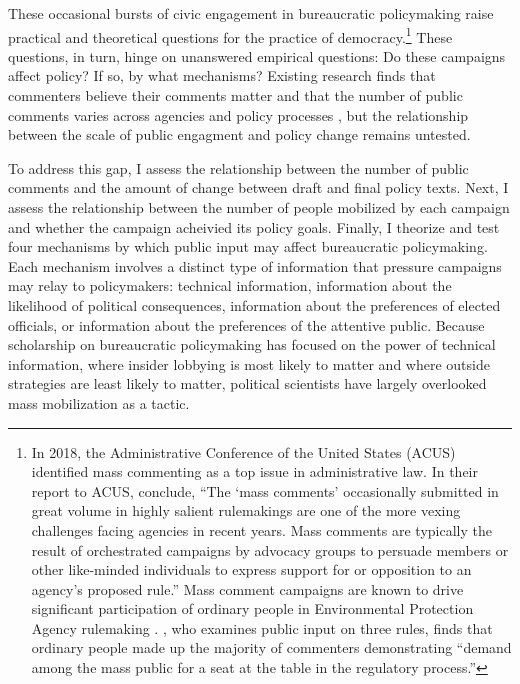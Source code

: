 These occasional bursts of civic engagement in bureaucratic policymaking raise practical and theoretical questions for the practice of democracy.\footnote{In 2018, the Administrative Conference of the United States (ACUS) identified mass commenting as a top issue in administrative law. In their report to ACUS, \citet{SantAmbrogio2018} conclude, ``The `mass comments' occasionally submitted in great volume in highly salient rulemakings are one of the more vexing challenges facing agencies in recent years. Mass comments are typically the result of orchestrated campaigns by advocacy groups to persuade members or other like-minded individuals to express support for or opposition to an agency's proposed rule.'' 
Mass comment campaigns are known to drive significant participation of ordinary people in Environmental Protection Agency rulemaking \citep{Judge-Lord2019, Potter2017, Balla2018}. \citet{Cuellar2005}, who examines public input on three rules, finds that ordinary people made up the majority of commenters demonstrating ``demand among the mass public for a seat at the table in the regulatory process.'' } 
These questions, in turn, hinge on unanswered empirical questions: Do these campaigns affect policy? If so, by what mechanisms? Existing research finds that commenters believe their comments matter \citep{Yackee2015JPART} and that the number of public comments varies across agencies and policy processes \citep{Judge-Lord2019, Libgober2018, Moore2017},
but the relationship between the scale of public engagment and policy change remains untested. 

To address this gap, I assess the relationship between the number of public comments and the amount of change between draft and final policy texts. Next, I assess the relationship between the number of people mobilized by each campaign and whether the campaign acheivied its policy goals. Finally, I theorize and test four mechanisms by which public input may affect bureaucratic policymaking. Each mechanism involves a distinct type of information that pressure campaigns may relay to policymakers: technical information, information about the likelihood of political consequences, information about the preferences of elected officials, or information about the preferences of the attentive public. Because scholarship on bureaucratic policymaking has focused on the power of technical information, where insider lobbying is most likely to matter and where outside strategies are least likely to matter, political scientists have largely overlooked mass mobilization as a tactic.

